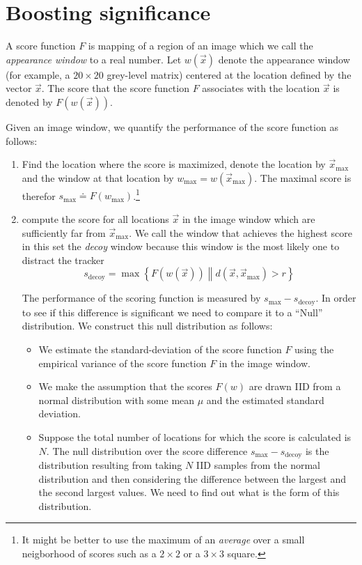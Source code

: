 \documentclass[11pt]{article}
\begin{document}
\section{Boosting significance}

\newcommand{\vx}{\vec{x}}
\newcommand{\vxmax}{\vec{x}_{\mbox{max}}}
\newcommand{\wmax}{w_{\mbox{max}}}
\newcommand{\smax}{s_{\mbox{max}}}
\newcommand{\sdecoy}{s_{\mbox{decoy}}}

A score function $F$ is mapping of a region of an image which we call the
{\em appearance window} to a real number. Let $w(\vx)$ denote the
appearance window (for example, a $20 \times 20$ grey-level matrix)
centered at the location defined by the vector $\vx$. The score that
the score function $F$ associates with the location $\vx$ is denoted
by $F(w(\vx))$.

Given an image window, we quantify the performance of the score
function as follows:
\begin{enumerate}
\item Find the location where the score is maximized, denote the
  location by $\vxmax$ and the window at that location by
  $\wmax=w(\vxmax)$. The maximal score is therefor
  $\smax \doteq F(\wmax)$.\footnote{It might be better to use the maximum of an
    {\em average} over a small neigborhood of scores such as a $2
    \times 2$ or a $3 \times 3$ square.}
\item compute the score for all locations $\vx$ in the image window
  which are sufficiently far from $\vxmax$. We call the window that
  achieves the highest score in this set the {\em decoy} window
  because this window is the most likely one to distract the tracker
\[
\sdecoy = \max \left\{ F(w(\vx)) \left\| d(\vx,\vxmax)>r \right. \right\}
\]

The performance of the scoring function is measured by $\smax -
\sdecoy$. In order to see if this difference is significant we need to
compare it to a ``Null'' distribution. We construct this null
distribution as follows:
\begin{itemize}
\item We estimate the standard-deviation of the score function $F$
  using the empirical variance of the score function $F$ in the image
  window.
\item We make the assumption that the scores $F(w)$ are drawn IID from
  a normal distribution with some mean $\mu$ and the estimated
  standard deviation.
\item Suppose the total number of locations for which the score is
  calculated is $N$. The null distribution over the score difference
  $\smax - \sdecoy$ is the distribution resulting from taking $N$ IID
  samples from the normal distribution and then considering the
  difference between the largest and the second largest values. We
  need to find out what is the form of this distribution.
\end{itemize}
\end{enumerate}
\end{document}
